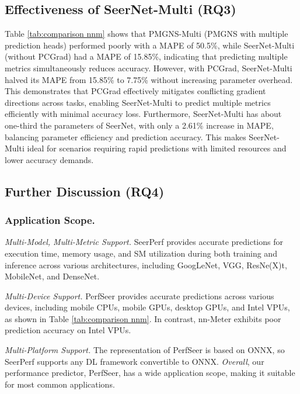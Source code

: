 


\subsection{Effectiveness of SeerNet-Multi (RQ3)}\label{sec:eva seernet multi}
Table \ref{tab:comparison nnm} shows that PMGNS-Multi (PMGNS with multiple prediction heads) performed poorly with a MAPE of 50.5\%, while SeerNet-Multi (without PCGrad) had a MAPE of 15.85\%, indicating that predicting multiple metrics simultaneously reduces accuracy.
%
However, with PCGrad, SeerNet-Multi halved its MAPE from 15.85\% to 7.75\% without increasing parameter overhead. This demonstrates that PCGrad effectively mitigates conflicting gradient directions across tasks, enabling SeerNet-Multi to predict multiple metrics efficiently with minimal accuracy loss.
%
Furthermore, SeerNet-Multi has about one-third the parameters of SeerNet, with only a 2.61\% increase in MAPE, balancing parameter efficiency and prediction accuracy. This makes SeerNet-Multi ideal for scenarios requiring rapid predictions with limited resources and lower accuracy demands.

\subsection{Further Discussion (RQ4)}\label{sec:extension experiments}
\subsubsection{Application Scope.}
\emph{Multi-Model, Multi-Metric Support.}
SeerPerf provides accurate predictions for execution time, memory usage, and SM utilization during both training and inference across various architectures, including GoogLeNet, VGG, ResNe(X)t, MobileNet, and DenseNet.

\emph{Multi-Device Support.}
PerfSeer provides accurate predictions across various devices, including mobile CPUs, mobile GPUs, desktop GPUs, and Intel VPUs, as shown in Table \ref{tab:comparison nnm}. In contrast, nn-Meter exhibits poor prediction accuracy on Intel VPUs.

\emph{Multi-Platform Support.}
The representation of PerfSeer is based on ONNX, so SeerPerf supports any DL framework convertible to ONNX.
\emph{Overall}, our performance predictor, PerfSeer, has a wide application scope, making it suitable for most common applications.

